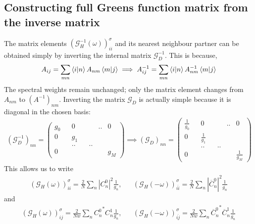 \documentclass[12pt]{article}
\numberwithin{equation}{section}
\begin{document}
\subsection{Constructing full Greens function matrix from the inverse matrix}
The matrix elements $\left(\mathcal{G}_{H}^{-1}(\omega)\right)_{ii}^\sigma$ and its nearest neighbour partner can be obtained simply by inverting the internal matrix $\mathcal{G}^{-1}_D$. This is because,
\begin{equation}\begin{aligned}
	A_{ij} = \sum_{mn}\braket{i | n} A_{nm} \braket{m|j} \implies A^{-1}_{ij} = \sum_{mn}\braket{i|n} A^{-1}_{nm} \braket{m|j}
\end{aligned}\end{equation}
The spectral weights remain unchanged; only the matrix element changes from $A_{nm}$ to $(A^{-1})_{nm}$. Inverting the matrix $\mathcal{G}_D$ is actually simple because it is diagonal in the chosen basis:
\begin{equation}\begin{aligned}
	\left(\mathcal{G}^{-1}_D\right)_{nn} = \begin{pmatrix} g_{0} && 0 && &..& 0\\ 0 && g_{1} && && \\ &&..&& .. &&  \\ 0 &&&&&& g_{M} \end{pmatrix} \implies \left(\mathcal{G}_D\right)_{nn} = \begin{pmatrix} \frac{1}{g_{0}} && 0 && &..& 0\\ 0 && \frac{1}{g_{1}} && && \\ &&..&& .. &&  \\ 0 &&&&&& \frac{1}{g_{M}} \end{pmatrix}
\end{aligned}\end{equation}
This allows us to write
\begin{equation}\begin{aligned}
	\label{G_mat_loc}
	\left(\mathcal{G}_{H}(\omega)\right)_{ii}^\sigma = \frac{2}{N}\sum_{n} |C^0_{n}|^2 \frac{1}{g_n}, && \left(\mathcal{G}_{H}(-\omega)\right)_{\overline{ii}}^\sigma = \frac{2}{N}\sum_{n} |\overline C^0_{n}|^2 \frac{1}{\overline{g_n}}
\end{aligned}\end{equation}
and
\begin{equation}\begin{aligned}
	\label{G_mat_nn}
	\left(\mathcal{G}_{H}(\omega)\right)_{ij}^\sigma = \frac{2}{Nw}\sum_{n} {C^0_{n}}^* C^1_{n} \frac{1}{g_n}, && \left(\mathcal{G}_{H}(-\omega)\right)_{\overline{ij}}^\sigma = \frac{2}{Nw}\sum_{n} {\overline C^0_{n}}^* \overline C^1_{n} \frac{1}{\overline{g_n}}
\end{aligned}\end{equation}
\end{document}
